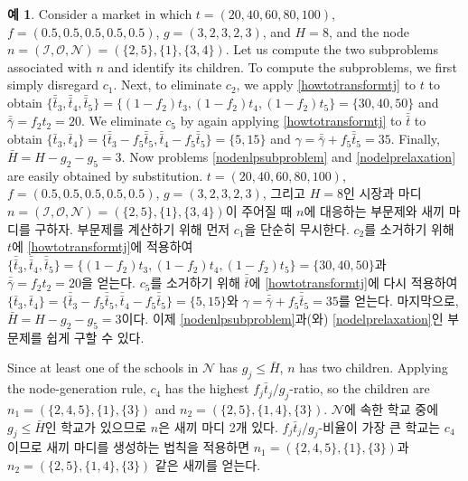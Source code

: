 \documentclass[11pt]{article} %
\theoremstyle{definition}
\newtheorem{example}{Example}
\theoremstyle{definition}
\newtheorem{example}{예}
\begin{document}
\begin{example}
\ifen
Consider a market in which $t = (20, 40, 60, 80, 100)$, $f = (0.5, 0.5, 0.5, 0.5, 0.5)$, $g = (3, 2, 3, 2, 3)$, and $H = 8$, and the node $n =  (\mathcal{I}, \mathcal{O}, \mathcal{N}) = (\{2, 5\}, \{1\}, \{3, 4\})$. Let us compute the two subproblems associated with $n$ and identify its children. To compute the subproblems, we first simply disregard $c_1$. Next, to eliminate $c_2$, we apply \eqref{howtotransformtj} to $t$ to obtain
$\{\bar{\bar t}_3, \bar{\bar t}_4, \bar{\bar t}_5\} = \{ (1 - f_2) t_3, (1 - f_2) t_4, (1 -f_2) t_5\} = \{30, 40, 50 \}$ and $\bar{\bar \gamma} = f_2 t_2 = 20$. We eliminate $c_5$ by again applying \eqref{howtotransformtj} to $\bar{ \bar t}$ to obtain $\{\bar t_3, \bar t_4\} =  \{\bar{\bar t}_3 - f_5 \bar{\bar t}_5, \bar{\bar t}_4-  f_5 \bar{\bar t}_5\}= \{5, 15\}$ and $\gamma = \bar{\bar \gamma} + f_5 \bar{\bar t}_5 = 35$. Finally, $\bar H = H - g_2 - g_5 = 3$. Now problems \eqref{nodenlpsubproblem} and \eqref{nodelprelaxation} are easily obtained by substitution.
\else
 $t = (20, 40, 60, 80, 100)$, $f = (0.5, 0.5, 0.5, 0.5, 0.5)$, $g = (3, 2, 3, 2, 3)$, 그리고 $H = 8$인 시장과 마디 $n =  (\mathcal{I}, \mathcal{O}, \mathcal{N}) = (\{2, 5\}, \{1\}, \{3, 4\})$이 주어질 때 $n$에 대응하는 부문제와 새끼 마디를 구하자. 부문제를 계산하기 위해 먼저 $c_1$을 단순히 무시한다.  $c_2$를 소거하기 위해 $t$에 \eqref{howtotransformtj}에 적용하여 
$\{\bar{\bar t}_3, \bar{\bar t}_4, \bar{\bar t}_5\} = \{ (1 - f_2) t_3, (1 - f_2) t_4, (1 -f_2) t_5\} = \{30, 40, 50 \}$과 $\bar{\bar \gamma} = f_2 t_2 = 20$을 얻는다. $c_5$를 소거하기 위해 $\bar{\bar t}$에 \eqref{howtotransformtj}에 다시 적용하여 $\{\bar t_3, \bar t_4\} =  \{\bar{\bar t}_3 - f_5 \bar{\bar t}_5, \bar{\bar t}_4-  f_5 \bar{\bar t}_5\}= \{5, 15\}$와 $\gamma = \bar{\bar \gamma} + f_5 \bar{\bar t}_5 = 35$를 얻는다. 마지막으로, $\bar H = H - g_2 - g_5 = 3$이다. 이제 \eqref{nodenlpsubproblem}과(와) \eqref{nodelprelaxation}인 부문제를 쉽게 구할 수 있다.
\fi

\ifen
Since at least one of the schools in $\mathcal{N}$ has $g_j \leq \bar H$, $n$ has two children. Applying the node-generation rule, $c_4$ has the highest $f_j \bar t_j / g_j$-ratio, so the children are $n_1 = (\{2, 4, 5\}, \{1\}, \{3\})$ and $n_2 = (\{2, 5\}, \{1, 4\}, \{3\})$.
\else
$\mathcal{N}$에 속한 학교 중에 $g_j \leq \bar H$인 학교가 있으므로 $n$은 새끼 마디 2개 있다. $f_j \bar t_j / g_j$-비율이 가장 큰 학교는 $c_4$이므로 새끼 마디를 생성하는 법칙을 적용하면 $n_1 = (\{2, 4, 5\}, \{1\}, \{3\})$과 $n_2 = (\{2, 5\}, \{1, 4\}, \{3\})$ 같은 새끼를 얻는다.
\fi
\end{example}
\end{document}
